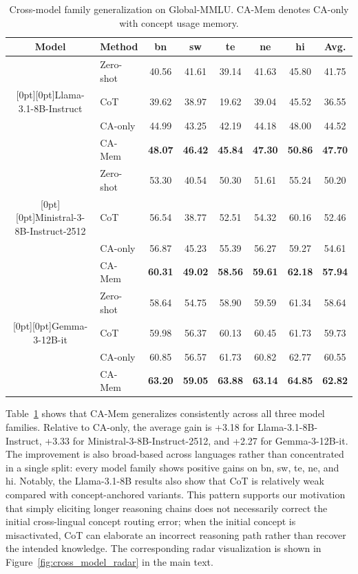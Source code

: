 \documentclass[11pt]{article}
\begin{document}
\begin{table}[t]
\centering
\scriptsize
\setlength{\tabcolsep}{3pt}
\renewcommand{\arraystretch}{0.95}
\begin{tabular*}{\textwidth}{@{\extracolsep{\fill}} c l c c c c c c}
\hline
Model & Method & bn & sw & te & ne & hi & Avg. \\
\hline
 & Zero-shot & 40.56 & 41.61 & 39.14 & 41.63 & 45.80 & 41.75 \\
\raisebox{-0.5\baselineskip}[0pt][0pt]{Llama-3.1-8B-Instruct} & CoT & 39.62 & 38.97 & 19.62 & 39.04 & 45.52 & 36.55 \\
 & CA-only & 44.99 & 43.25 & 42.19 & 44.18 & 48.00 & 44.52 \\
 & CA-Mem & \textbf{48.07} & \textbf{46.42} & \textbf{45.84} & \textbf{47.30} & \textbf{50.86} & \textbf{47.70} \\
\hline
 & Zero-shot & 53.30 & 40.54 & 50.30 & 51.61 & 55.24 & 50.20 \\
\raisebox{-0.5\baselineskip}[0pt][0pt]{Ministral-3-8B-Instruct-2512} & CoT & 56.54 & 38.77 & 52.51 & 54.32 & 60.16 & 52.46 \\
 & CA-only & 56.87 & 45.23 & 55.39 & 56.27 & 59.27 & 54.61 \\
 & CA-Mem & \textbf{60.31} & \textbf{49.02} & \textbf{58.56} & \textbf{59.61} & \textbf{62.18} & \textbf{57.94} \\
\hline
 & Zero-shot & 58.64 & 54.75 & 58.90 & 59.59 & 61.34 & 58.64 \\
\raisebox{-0.5\baselineskip}[0pt][0pt]{Gemma-3-12B-it} & CoT & 59.98 & 56.37 & 60.13 & 60.45 & 61.73 & 59.73 \\
 & CA-only & 60.85 & 56.57 & 61.73 & 60.82 & 62.77 & 60.55 \\
 & CA-Mem & \textbf{63.20} & \textbf{59.05} & \textbf{63.88} & \textbf{63.14} & \textbf{64.85} & \textbf{62.82} \\
\hline
\end{tabular*}
\caption{Cross-model family generalization on Global-MMLU. CA-Mem denotes CA-only with concept usage memory.}
\label{tab:cross_model}
\end{table}

Table~\ref{tab:cross_model} shows that CA-Mem generalizes consistently across all three model families. Relative to CA-only, the average gain is +3.18 for Llama-3.1-8B-Instruct, +3.33 for Ministral-3-8B-Instruct-2512, and +2.27 for Gemma-3-12B-it. The improvement is also broad-based across languages rather than concentrated in a single split: every model family shows positive gains on bn, sw, te, ne, and hi. Notably, the Llama-3.1-8B results also show that CoT is relatively weak compared with concept-anchored variants. This pattern supports our motivation that simply eliciting longer reasoning chains does not necessarily correct the initial cross-lingual concept routing error; when the initial concept is misactivated, CoT can elaborate an incorrect reasoning path rather than recover the intended knowledge. The corresponding radar visualization is shown in Figure~\ref{fig:cross_model_radar} in the main text.
\end{document}
